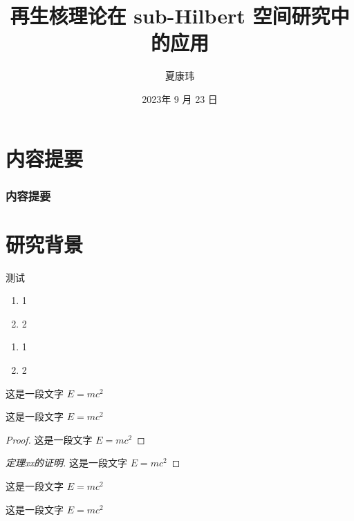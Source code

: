 \documentclass{whu-beamer}
\title[硕士毕业论文开题报告答辩]{再生核理论在 sub-Hilbert 空间研究中的应用}
\author[Kangwei Xia]{夏康玮}
\institute[WHU]{武汉大学数学与统计学院}
\date[Sep. 23rd, 2023]{2023年 9 月 23 日}
\begin{document}
\maketitle


\section{内容提要}

\begin{frame}
  \frametitle{内容提要}
  \tableofcontents[hideallsubsections]
\end{frame}



\section{研究背景}
\begin{frame}{测试}
  \begin{enumerate}[i]
    \item 1
    \item 2
  \end{enumerate}
  \begin{enumerate}[a]
    \item 1
    \item 2
  \end{enumerate}
\end{frame}

\begin{frame}
  \begin{definition}
    这是一段文字 $E = m c^2$
  \end{definition}
  
  \begin{theorem}
    这是一段文字 $E = m c^2$
  \end{theorem}
  
  
  \begin{proof}
    这是一段文字 $E = m c^2$
  \end{proof}
  
  \begin{proof}[定理xx的证明]
    这是一段文字 $E = m c^2$
  \end{proof}
  
\end{frame}

\begin{frame}
  \begin{example}
    这是一段文字 $E = m c^2$
  \end{example}
  
  \begin{corollary}
    这是一段文字 $E = m c^2$
  \end{corollary}
\end{frame}
\end{document}
